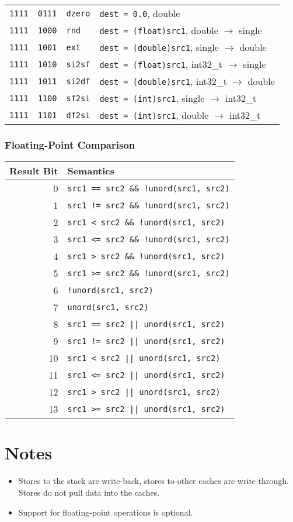 \documentclass[10pt,a4paper]{article}
\begin{document}
\begin{tabular}{ccll}
\texttt{1111} & \texttt{0111} & \texttt{dzero} & \texttt{dest = 0.0}, double \\
\texttt{1111} & \texttt{1000} & \texttt{rnd} & \texttt{dest = (float)src1}, double $\rightarrow$ single \\
\texttt{1111} & \texttt{1001} & \texttt{ext} & \texttt{dest = (double)src1}, single $\rightarrow$ double \\
\texttt{1111} & \texttt{1010} & \texttt{si2sf} & \texttt{dest = (float)src1}, int32\_t $\rightarrow$ single \\
\texttt{1111} & \texttt{1011} & \texttt{si2df} & \texttt{dest = (double)src1}, int32\_t $\rightarrow$ double \\
\texttt{1111} & \texttt{1100} & \texttt{sf2si} & \texttt{dest = (int)src1}, single $\rightarrow$ int32\_t \\
\texttt{1111} & \texttt{1101} & \texttt{df2si} & \texttt{dest = (int)src1}, double $\rightarrow$ int32\_t \\
\bottomrule
\end{tabular}

\subsubsection{Floating-Point Comparison}
\label{sec:fcmp}

\begin{tabular}{rl}
\toprule
Result Bit & Semantics \\
\midrule
0 & \texttt{src1 == src2 \&\& !unord(src1, src2)} \\
1 & \texttt{src1 != src2 \&\& !unord(src1, src2)} \\
2 & \texttt{src1 < src2 \&\& !unord(src1, src2)} \\
3 & \texttt{src1 <= src2 \&\& !unord(src1, src2)} \\
4 & \texttt{src1 > src2 \&\& !unord(src1, src2)} \\
5 & \texttt{src1 >= src2 \&\& !unord(src1, src2)} \\
6 & \texttt{!unord(src1, src2)} \\
7 & \texttt{unord(src1, src2)} \\
8 & \texttt{src1 == src2 || unord(src1, src2)} \\
9 & \texttt{src1 != src2 || unord(src1, src2)} \\
10 & \texttt{src1 < src2 || unord(src1, src2)} \\
11 & \texttt{src1 <= src2 || unord(src1, src2)} \\
12 & \texttt{src1 > src2 || unord(src1, src2)} \\
13 & \texttt{src1 >= src2 || unord(src1, src2)} \\
\bottomrule
\end{tabular}

\section{Notes}

\begin{itemize}
\item Stores to the stack are write-back, stores to other caches are
  write-through. Stores do not pull data into the caches.
\item Support for floating-point operations is optional.
\end{itemize}
\end{document}
